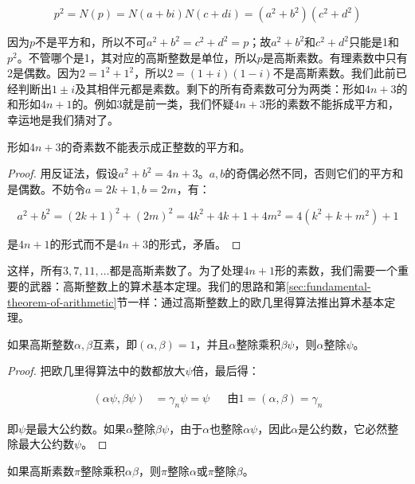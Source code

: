 \documentclass[b5paper]{ctexart}
\begin{document}
\[
p^2 = N(p) = N(a + bi)N(c + di) = (a^2 + b^2)(c^2 + d^2)
\]

因为$p$不是平方和，所以不可$a^2 + b^2 = c^2 + d^2 = p$；故$a^2 + b^2$和$c^2 + d^2$只能是1和$p^2$。不管哪个是1，其对应的高斯整数是单位，所以$p$是高斯素数。有理素数中只有2是偶数。因为$2 = 1^2 + 1^2$，所以$2 = (1 + i)(1 - i)$不是高斯素数。我们此前已经判断出$1 \pm i$及其相伴元都是素数。剩下的所有奇素数可分为两类：形如$4n + 3$的和形如$4n + 1$的。例如3就是前一类，我们怀疑$4n + 3$形的素数不能拆成平方和，幸运地是我们猜对了。

\begin{proposition}
形如$4n + 3$的奇素数不能表示成正整数的平方和。
\end{proposition}

\begin{proof}
用反证法，假设$a^2 + b^2 = 4n + 3$。$a, b$的奇偶必然不同，否则它们的平方和是偶数。不妨令$a = 2k + 1, b = 2m$，有：

\[
a^2 + b^2 = (2k + 1)^2 + (2m)^2 = 4k^2 + 4k + 1 + 4m^2 = 4(k^2 + k + m^2) + 1
\]

是$4n + 1$的形式而不是$4n + 3$的形式，矛盾。
\end{proof}

这样，所有$3, 7, 11, \dotsc$都是高斯素数了。为了处理$4n + 1$形的素数，我们需要一个重要的武器：高斯整数上的算术基本定理。我们的思路和第\ref{sec:fundamental-theorem-of-arithmetic}节一样：通过高斯整数上的欧几里得算法推出算术基本定理。

\begin{proposition}
如果高斯整数$\alpha, \beta$互素，即$(\alpha, \beta) = 1$，并且$\alpha$整除乘积$\beta \psi$，则$\alpha$整除$\psi$。
\end{proposition}

\begin{proof}
把欧几里得算法中的数都放大$\psi$倍，最后得：

\begin{align*}
(\alpha \psi, \beta \psi) &= \gamma_n \psi = \psi  && \text{由} 1 = (\alpha, \beta) = \gamma_n
\end{align*}

即$\psi$是最大公约数。如果$\alpha$整除$\beta \psi$，由于$\alpha$也整除$\alpha \psi$，因此$\alpha$是公约数，它必然整除最大公约数$\psi$。
\end{proof}

\begin{corollary}\label{thm:Gaussian-primary}
如果高斯素数$\pi$整除乘积$\alpha \beta$，则$\pi$整除$\alpha$或$\pi$整除$\beta$。
\end{corollary}
\end{document}
